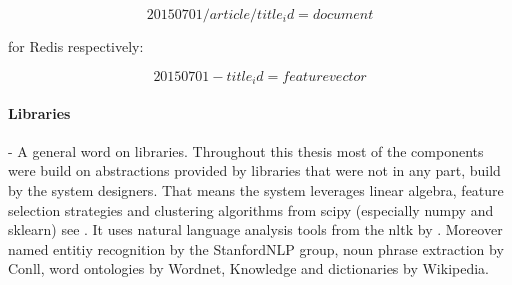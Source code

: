     \begin{equation}
      20150701/article/title_id = document
    \end{equation}

  for Redis respectively:

    \begin{equation}
      20150701-title_id = feature vector
    \end{equation}

  \paragraph{Libraries} - A general word on libraries. Throughout this thesis most of the components were build on abstractions provided by libraries that were not in any part, build by the system designers. That means the system leverages linear algebra, feature selection strategies and clustering algorithms from scipy (especially numpy and sklearn) see \cite{ScikitLearn}. It uses natural language analysis tools from the nltk by \cite{NltkPython}. Moreover named entitiy recognition by the StanfordNLP group, noun phrase extraction by Conll, word ontologies by Wordnet, Knowledge and dictionaries by Wikipedia.



